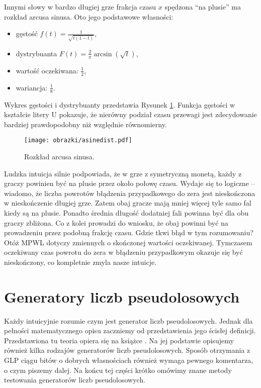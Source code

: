 \documentclass[a4paper,11pt,twoside]{book}
\theoremstyle{definition}
\begin{document}
Innymi słowy w bardzo długiej grze frakcja czasu $x$ spędzona ``na plusie'' ma rozkład arcusa sinusa. Oto jego podstawowe własności:
\begin{itemize}
 \item gęstość $f(t) =  \frac{1}{\sqrt{t(1-t)}}$,
 \item dystrybuanta $F(t) =  \frac{2}{\pi}\arcsin(\sqrt{t})$,
 \item wartość oczekiwana: $\frac{1}{2}$,
 \item wariancja: $\frac{1}{8}$.
\end{itemize}
Wykres gęstości i dystrybuanty przedstawia Rysunek \ref{fig:asine_dist}. Funkcja gęstości w kształcie litery U pokazuje, że nierówny podział czasu przewagi jest zdecydowanie bardziej prawdopodobny niż względnie równomierny.
\begin{figure}[ht]
 \centering
 \texttt{[image: obrazki/asinedist.pdf]}
 \caption{Rozkład arcusa sinusa.}
 \label{fig:asine_dist}
\end{figure}

Ludzka intuicja silnie podpowiada, że w grze z symetryczną monetą, każdy z graczy powinien być na plusie przez około połowę czasu. Wydaje się to logiczne -- wiadomo, że liczba powrotów błądzenia przypadkowego do zera jest nieskończona w nieskończenie długiej grze. Zatem obaj gracze mają mniej więcej tyle samo fal kiedy są na plusie. Ponadto średnia długość dodatniej fali powinna być dla obu graczy zbliżona. Co z kolei prowadzi do wniosku, że obaj powinni być na prowadzeniu przez podobną frakcję czasu. Gdzie tkwi błąd w tym rozumowaniu? Otóż MPWL dotyczy zmiennych o skończonej wartości oczekiwanej. Tymczasem oczekiwany czas powrotu do zera w błądzeniu przypadkowym okazuje się być nieskończony, co kompletnie zmyla nasze intuicje.

\chapter{Generatory liczb pseudolosowych}
\label{czesc:generatory}

Każdy intuicyjnie rozumie czym jest generator liczb pseudolosowych. Jednak dla pełności matematycznego opisu zaczniemy od przedstawienia jego ścisłej definicji. Przedstawiona tu teoria opiera się na książce \cite{asmussen}. Na jej podstawie opisujemy również kilka rodzajów generatorów liczb pseudolosowych. Sposób otrzymania z GLP ciągu bitów o dobrych własnościach również wymaga pewnego komentarza, o czym piszemy dalej. Na końcu tej części krótko omówimy znane metody testowania generatorów liczb pseudolosowych.
\end{document}
